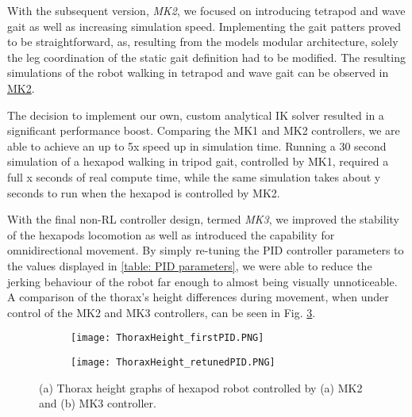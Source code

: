 With the subsequent version, \textit{MK2}, we focused on introducing tetrapod and wave gait as well as increasing simulation speed.
Implementing the gait patters proved to be straightforward, as, resulting from the models modular architecture, solely the leg coordination of the static gait definition had to be modified.
The resulting simulations of the robot walking in tetrapod and wave gait can be observed in \hyperref[vid: MK1]{MK2}.

The decision to implement our own, custom analytical IK solver resulted in a significant performance boost.
Comparing the MK1 and MK2 controllers, we are able to achieve an up to 5x speed up in simulation time.
Running a 30 second simulation of a hexapod walking in tripod gait, controlled by MK1, required a full x seconds of real compute time, while the same simulation takes about y seconds to run when the hexapod is controlled by MK2.


With the final non-RL controller design, termed \textit{MK3}, we improved the stability of the hexapods locomotion as well as introduced the capability for omnidirectional movement.
By simply re-tuning the PID controller parameters to the values displayed in \ref{table: PID parameters}, we were able to reduce the jerking behaviour of the robot far enough to almost being visually unnoticeable.
A comparison of the thorax's height differences during movement, when under control of the MK2 and MK3 controllers, can be seen in Fig. \ref{figure: Thorax height graphs}.


\begin{figure}[h]
	\begin{subfigure}{\textwidth} %
		\centering
		\texttt{[image: ThoraxHeight\_firstPID.PNG]}  %
		\caption{}
		\label{figure: Thorax Height graph, bad tuning}
	\end{subfigure}
	
	\begin{subfigure}{\textwidth}
		\centering
		\texttt{[image: ThoraxHeight\_retunedPID.PNG]}   %
		\caption{}
		\label{figure: Thorax height graph, re-tuning}
	\end{subfigure}
	\caption[Thorax height graphs]{(a) Thorax height graphs of hexapod robot controlled by (a) MK2 and (b) MK3 controller.}
	\label{figure: Thorax height graphs}
\end{figure}

